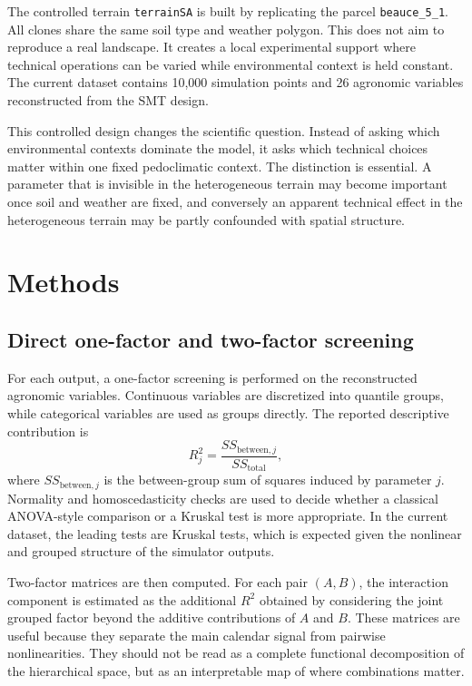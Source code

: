 \documentclass[11pt,a4paper]{article}
\begin{document}
The controlled terrain \texttt{terrainSA} is built by replicating the parcel \texttt{beauce\_5\_1}. All clones share the same soil type and weather polygon. This does not aim to reproduce a real landscape. It creates a local experimental support where technical operations can be varied while environmental context is held constant. The current dataset contains 10,000 simulation points and 26 agronomic variables reconstructed from the SMT design.

This controlled design changes the scientific question. Instead of asking which environmental contexts dominate the model, it asks which technical choices matter within one fixed pedoclimatic context. The distinction is essential. A parameter that is invisible in the heterogeneous terrain may become important once soil and weather are fixed, and conversely an apparent technical effect in the heterogeneous terrain may be partly confounded with spatial structure.

\section{Methods}

\subsection{Direct one-factor and two-factor screening}

For each output, a one-factor screening is performed on the reconstructed agronomic variables. Continuous variables are discretized into quantile groups, while categorical variables are used as groups directly. The reported descriptive contribution is
\begin{equation}
R^2_j = \frac{SS_{\mathrm{between},j}}{SS_{\mathrm{total}}},
\end{equation}
where $SS_{\mathrm{between},j}$ is the between-group sum of squares induced by parameter $j$. Normality and homoscedasticity checks are used to decide whether a classical ANOVA-style comparison or a Kruskal test is more appropriate. In the current dataset, the leading tests are Kruskal tests, which is expected given the nonlinear and grouped structure of the simulator outputs.

Two-factor matrices are then computed. For each pair $(A,B)$, the interaction component is estimated as the additional $R^2$ obtained by considering the joint grouped factor beyond the additive contributions of $A$ and $B$. These matrices are useful because they separate the main calendar signal from pairwise nonlinearities. They should not be read as a complete functional decomposition of the hierarchical space, but as an interpretable map of where combinations matter.
\end{document}
